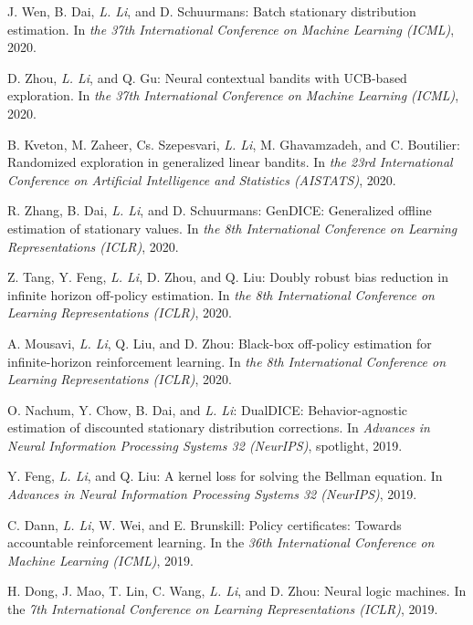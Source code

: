 \documentclass[10pt,twoside,letterpaper]{article}
\newcommand{\selffont}[1]{{\textit{#1}}}
\newcommand{\venuefont}[1]{{\textit{#1}}}
\newcommand{\myself}{\selffont{L. Li}}
\begin{document}
\begin{compactenum}[(C1)]
\item{J. Wen, B. Dai, \myself, and D. Schuurmans: Batch stationary distribution estimation.  In \venuefont{the 37th International Conference on Machine Learning (ICML)}, 2020.}

\item{D. Zhou, \myself, and Q. Gu: Neural contextual bandits with UCB-based exploration.  In \venuefont{the 37th International Conference on Machine Learning (ICML)}, 2020.}

\item{B. Kveton, M. Zaheer, Cs. Szepesvari, \myself, M. Ghavamzadeh, and C. Boutilier: Randomized exploration in generalized linear bandits.  In \venuefont{the 23rd International Conference on Artificial Intelligence and Statistics (AISTATS)}, 2020.}

\item{R. Zhang, B. Dai, \myself, and D. Schuurmans: GenDICE: Generalized offline estimation of stationary values.  In \venuefont{the 8th International Conference on Learning Representations (ICLR)}, 2020.}

\item{Z. Tang, Y. Feng, \myself, D. Zhou, and Q. Liu: Doubly robust bias reduction in infinite horizon off-policy estimation.  In \venuefont{the 8th International Conference on Learning Representations (ICLR)}, 2020.}

\item{A. Mousavi, \myself, Q. Liu, and D. Zhou: Black-box off-policy estimation for infinite-horizon reinforcement learning.  In \venuefont{the 8th International Conference on Learning Representations (ICLR)}, 2020.}

\item{O. Nachum, Y. Chow, B. Dai, and \myself: DualDICE: Behavior-agnostic estimation of discounted stationary distribution corrections. In \venuefont{Advances in Neural Information Processing Systems 32 (NeurIPS)}, spotlight, 2019.}

\item{Y. Feng, \myself, and Q. Liu: A kernel loss for solving the Bellman equation. In \venuefont{Advances in Neural Information Processing Systems 32 (NeurIPS)}, 2019.}

\item{C. Dann, \myself, W. Wei, and E. Brunskill: Policy certificates: Towards accountable reinforcement learning. In the \venuefont{36th International Conference on Machine Learning (ICML)}, 2019.}

\item{H. Dong, J. Mao, T. Lin, C. Wang, \myself, and D. Zhou: Neural logic machines.  In the \venuefont{7th International Conference on Learning Representations (ICLR)}, 2019.}


\end{compactenum}
\end{document}
